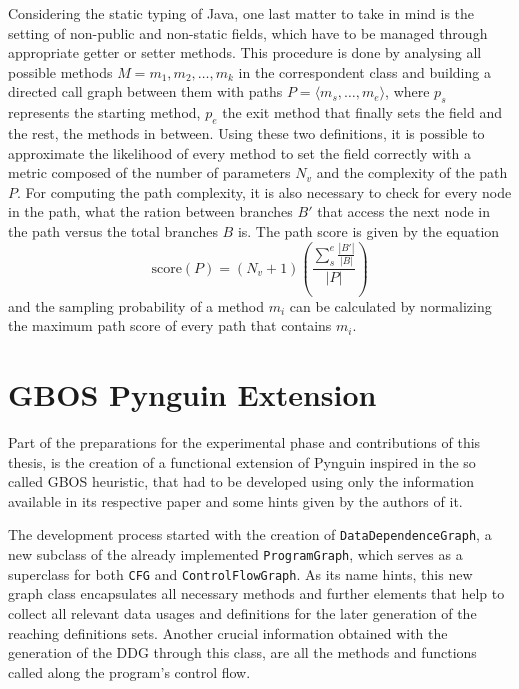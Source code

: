 \documentclass[%
  chapterprefix=false,%
  open=right,%
  twoside=true,%
  paper=a4,%
  logofile={Figures/logo.png},%
  thesistype=master,%
  UKenglish,%
]{se2thesis}
\newcommand{\classname}[1]{\texttt{#1}}
\begin{document}
Considering the static typing of Java, one last matter to take in mind is the setting of non-public and non-static fields, which have to be managed through appropriate getter or setter methods.
This procedure is done by analysing all possible methods \(M = {m_1, m_2, \dots, m_k} \) in the correspondent class and building a directed call graph between them with paths \(P = \langle m_s, \dots, m_e\rangle\), where \(p_s\) represents the starting method, \(p_e\) the exit method that finally sets the field and the rest, the methods in between.
Using these two definitions, it is possible to approximate the likelihood of every method to set the field correctly with a metric composed of the number of parameters \(N_v\) and the complexity of the path \(P\).
For computing the path complexity, it is also necessary to check for every node in the path, what the ration between branches \(B'\) that access the next node in the path versus the total branches \(B\) is.
The path score is given by the equation
\begin{equation*}
  \text{score}(P) = (N_v + 1)\left(\frac{\sum_{s}^{e} \frac{|B'|}{|B|}}{|P|}\right)
\end{equation*}
and the sampling probability of a method \(m_i\) can be calculated by normalizing the maximum path score of every path that contains \(m_i\).

\chapter{GBOS Pynguin Extension}\label{chap:implementation}

Part of the preparations for the experimental phase and contributions of this thesis, is the creation of a functional extension of Pynguin inspired in the so called GBOS heuristic, that had to be developed using only the information available in its respective paper and some hints given by the authors of it.

The development process started with the creation of \classname{DataDependenceGraph}, a new subclass of the already implemented \classname{ProgramGraph}, which serves as a superclass for both \classname{CFG} and \classname{ControlFlowGraph}.
As its name hints, this new graph class encapsulates all necessary methods and further elements that help to collect all relevant data usages and definitions for the later generation of the reaching definitions sets.
Another crucial information obtained with the generation of the DDG through this class, are all the methods and functions called along the program's control flow.  
\end{document}
